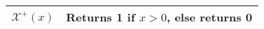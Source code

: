 \begin{appendices}
\begin{center}
\begin{tabular}{ c c }
		\begin{math}\mathcal{X}^+(x)\end{math} & Returns 1 if \begin{math}x > 0\end{math}, else returns 0 \\
		\hline
	\end{tabular}
\end{center}

\end{appendices}
